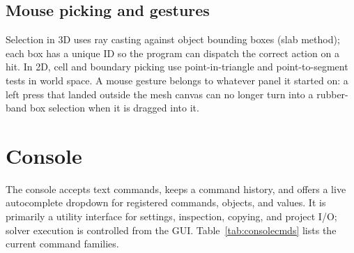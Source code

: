 \documentclass[11pt]{article}
\begin{document}
\subsection{Mouse picking and gestures}
Selection in 3D uses ray casting against object bounding boxes (slab method); each box
has a unique ID so the program can dispatch the correct action on a hit. In 2D, cell and
boundary picking use point-in-triangle and point-to-segment tests in world space. A
mouse gesture belongs to whatever panel it started on: a left press that landed outside
the mesh canvas can no longer turn into a rubber-band box selection when it is dragged
into it.

\section{Console}\label{sec:console}
The console accepts text commands, keeps a command history, and offers a live
autocomplete dropdown for registered commands, objects, and values. It is primarily a
utility interface for settings, inspection, copying, and project I/O; solver execution is
controlled from the GUI. Table~\ref{tab:consolecmds} lists the current command families.
\end{document}
